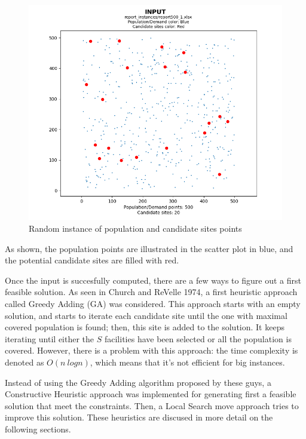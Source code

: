 \documentclass[11pt, a4paper]{article}
\begin{document}
\begin{figure}[h]
	\centering
	\includegraphics[scale=0.8]{example_instance_input.png}
	\caption{Random instance of population and candidate sites points}
	\label{fig:example_instance_input}
\end{figure}

As shown, the population points are illustrated in the scatter plot in blue, and the potential candidate sites are filled with red.

Once the input is succesfully computed, there are a few ways to figure out a first feasible solution. As seen in Church and ReVelle 1974, a first heuristic approach called Greedy Adding (GA) was considered. This approach starts with an empty solution, and starts to iterate each candidate site until the one with maximal covered population is found; then, this site is added to the solution. It keeps iterating until either the $S$ facilities have been selected or all the population is covered. However, there is a problem with this approach: the time complexity is denoted as $O(n \ logn)$, which means that it's not efficient for big instances.

Instead of using the Greedy Adding algorithm proposed by these guys, a Constructive Heuristic approach was implemented for generating first a feasible solution that meet the constraints. Then, a Local Search move approach tries to improve this solution. These heuristics are discused in more detail on the following sections.
\end{document}
